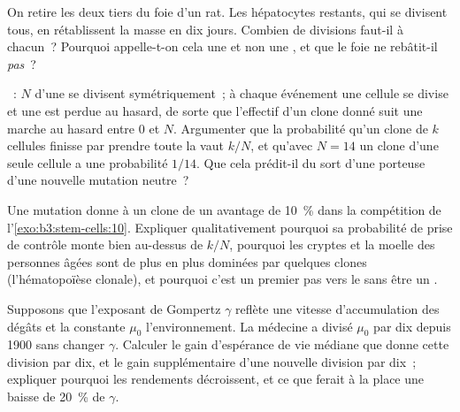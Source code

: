 \begin{exercise}[$\star\star$]\label{exo:b3:stem-cells:9}
On retire les deux tiers du foie d'un rat. Les hépatocytes restants, qui
se divisent tous, en rétablissent la masse en dix jours. Combien de
divisions faut-il à chacun~? Pourquoi appelle-t-on cela une  et non une , et que le foie ne rebâtit-il
\emph{pas}~?
\end{exercise}

\begin{exercise}[$\star\star\star$]\label{exo:b3:stem-cells:10}
~: $N$  d'une  se divisent
symétriquement~; à chaque événement une cellule se divise et une est
perdue au hasard, de sorte que l'effectif d'un clone donné suit une
marche au hasard entre $0$ et $N$. Argumenter que la probabilité qu'un
clone de $k$ cellules finisse par prendre toute la  vaut $k/N$, et
qu'avec $N = 14$ un clone d'une seule cellule a une probabilité $1/14$. Que
cela prédit-il du sort d'une  porteuse d'une nouvelle
mutation neutre~?
\end{exercise}

\begin{exercise}[$\star\star\star$]\label{exo:b3:stem-cells:11}
Une mutation donne à un clone de  un avantage de
\qty{10}{\%} dans la compétition de l'\cref{exo:b3:stem-cells:10}.
Expliquer qualitativement pourquoi sa probabilité de prise de contrôle
monte bien au-dessus de $k/N$, pourquoi les cryptes et la moelle des
personnes âgées sont de plus en plus dominées par quelques clones
(l'hématopoïèse clonale), et pourquoi c'est un premier pas vers le
 sans être un .
\end{exercise}

\begin{exercise}[$\star\star\star$]\label{exo:b3:stem-cells:12}
Supposons que l'exposant de Gompertz $\gamma$ reflète une vitesse
d'accumulation des dégâts et la constante $\mu_{0}$ l'environnement. La
médecine a divisé $\mu_{0}$ par dix depuis 1900 sans changer $\gamma$.
Calculer le gain d'espérance de vie médiane que donne cette division par
dix, et le gain supplémentaire d'une nouvelle division par dix~;
expliquer pourquoi les rendements décroissent, et ce que ferait à la
place une baisse de \qty{20}{\%} de $\gamma$.
\end{exercise}

